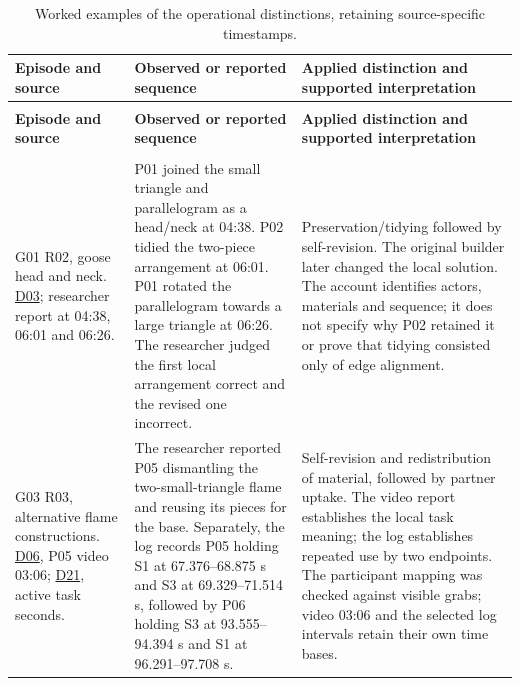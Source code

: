 \begingroup
{}
\fontsize{9.5}{11.685}\selectfont
\setlength{\tabcolsep}{2.2pt}
\renewcommand{\arraystretch}{1.18}
\begin{longtable}{@{}>{\raggedright\arraybackslash}p{29.420mm}>{\raggedright\arraybackslash}p{63.744mm}>{\raggedright\arraybackslash}p{63.744mm}@{}}
\caption[Worked examples of the operational distinctions, retaining source-specific timestamps.]{Worked examples of the operational distinctions, retaining source-specific timestamps.}\label{tab:C-2}\\
\toprule
\textbf{Episode and source} & \textbf{Observed or reported sequence} & \textbf{Applied distinction and supported interpretation} \\
\midrule
\endfirsthead
\multicolumn{3}{l}{\small\itshape Table \thetable{} (continued)}\\
\toprule
\textbf{Episode and source} & \textbf{Observed or reported sequence} & \textbf{Applied distinction and supported interpretation} \\
\midrule
\endhead
\midrule
\multicolumn{3}{r}{\small Continued on next page}\\
\endfoot
\bottomrule
\endlastfoot
G01 R02, goose head and neck. \hyperlink{src:D03}{D03}; researcher report at 04:38, 06:01 and 06:26. & P01 joined the small triangle and parallelogram as a head/neck at 04:38. P02 tidied the two-piece arrangement at 06:01. P01 rotated the parallelogram towards a large triangle at 06:26. The researcher judged the first local arrangement correct and the revised one incorrect. & Preservation/tidying followed by self-revision. The original builder later changed the local solution. The account identifies actors, materials and sequence; it does not specify why P02 retained it or prove that tidying consisted only of edge alignment. \\
\addlinespace[3pt]
G03 R03, alternative flame constructions. \hyperlink{src:D06}{D06}, P05 video 03:06; \hyperlink{src:D21}{D21}, active task seconds. & The researcher reported P05 dismantling the two-small-triangle flame and reusing its pieces for the base. Separately, the log records P05 holding S1 at 67.376--68.875 s and S3 at 69.329--71.514 s, followed by P06 holding S3 at 93.555--94.394 s and S1 at 96.291--97.708 s. & Self-revision and redistribution of material, followed by partner uptake. The video report establishes the local task meaning; the log establishes repeated use by two endpoints. The participant mapping was checked against visible grabs; video 03:06 and the selected log intervals retain their own time bases. \\

\end{longtable}
